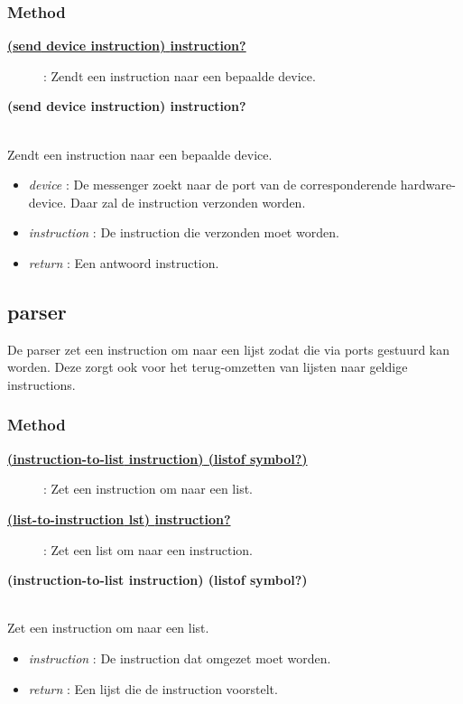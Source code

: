 \documentclass{article}
\newcommand{\ar}{\ding{213} }
\newcommand{\code}[1]{\textcolor{code}{#1}}
\newcommand{\lb}[1][]{\code{(#1}}
\newcommand{\rb}{\code{)}}
\newcommand{\racket}[1]{
	{\color{blue}\textbf{#1}}
}
\begin{document}
	\subsubsection{Method}
	\begin{description}
		\item[\hyperlink{messenger:send}{\racket{\lb[send] device instruction\rb \ar \code{instruction?}}}] : Zendt een instruction naar een bepaalde device.
	\end{description}
	
	\begin{framed}
		\hypertarget{messenger:send}{\racket{\lb[send] device instruction\rb \ar \code{instruction?}}}
		\\Zendt een instruction naar een bepaalde device.
		\begin{itemize}
			\item \emph{device} : De messenger zoekt naar de port van de corresponderende hardware-device. Daar zal de instruction verzonden worden.
			\item \emph{instruction} : De instruction die verzonden moet worden.
			\item \emph{return} : Een antwoord instruction.
		\end{itemize}
	\end{framed}
	
	\newpage
	\hypertarget{parser}{\subsection{parser}}
	De parser zet een instruction om naar een lijst zodat die via ports gestuurd kan worden.  Deze zorgt ook voor het terug-omzetten van lijsten naar geldige instructions.
	
	\subsubsection{Method}
		\begin{description}
			\item[\hyperlink{parser:instruction-to-list}{\racket{\lb[instruction-to-list] instruction\rb \ar \lb[listof] symbol?\rb}}] : Zet een instruction om naar een list.
			\item[\hyperlink{parser:list-to-instruction}{\racket{\lb[list-to-instruction] lst\rb \ar \code{instruction?}}}] : Zet een list om naar een instruction.
		\end{description}
		
		\begin{framed}
			\hypertarget{parser:instruction-to-list}{\racket{\lb[instruction-to-list] instruction\rb \ar \lb[listof] symbol?\rb}}
			\\Zet een instruction om naar een list.
			\begin{itemize}
				\item \emph{instruction} : De instruction dat omgezet moet worden.
				\item \emph{return} : Een lijst die de instruction voorstelt.
			\end{itemize}
		\end{framed}
		
\end{document}

